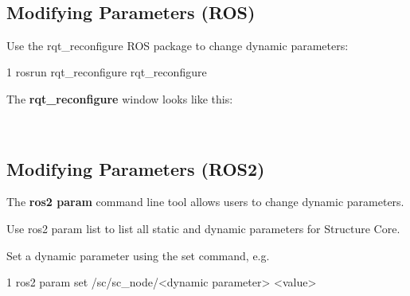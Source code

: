 ~\newline
\hypertarget{ros_main_features_mod_dynamic_params_ros}{}\subsection{Modifying Parameters (\+R\+O\+S)}\label{ros_main_features_mod_dynamic_params_ros}
Use the {\ttfamily rqt\+\_\+reconfigure} R\+OS package to change dynamic parameters\+:


\begin{DoxyCode}
1 rosrun rqt\_reconfigure rqt\_reconfigure
\end{DoxyCode}


The {\bfseries rqt\+\_\+reconfigure} window looks like this\+:



~\newline
\hypertarget{ros_main_features_mod_dynamic_params_ros2}{}\subsection{Modifying Parameters (\+R\+O\+S2)}\label{ros_main_features_mod_dynamic_params_ros2}
The {\bfseries ros2 param} command line tool allows users to change dynamic parameters.


\begin{DoxyItemize}
\item Use {\ttfamily ros2 param list} to list all static and dynamic parameters for Structure Core.
\item Set a dynamic parameter using the {\ttfamily set} command, e.\+g.
\end{DoxyItemize}


\begin{DoxyCode}
1 ros2 param set /sc/sc\_node/<dynamic parameter> <value>
\end{DoxyCode}
 
